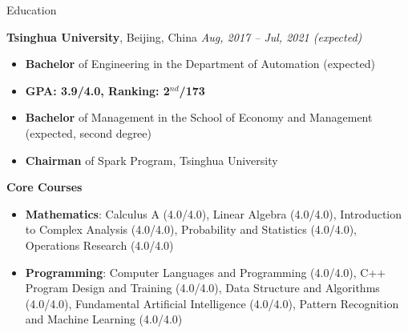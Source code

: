 \documentclass{resume} %
\begin{document}

\begin{rSection}{Education}

{\textbf{Tsinghua University}, Beijing, China} \hfill {\em Aug, 2017 -- Jul, 2021 (expected)}
\begin{itemize}
    \item \textbf{Bachelor} of Engineering in the Department of Automation (expected)
    \item \textbf{GPA: 3.9/4.0, Ranking: 2$^{nd}$/173}
    \item \textbf{Bachelor} of Management in the School of Economy and Management (expected, second degree)
    \item \textbf{Chairman} of Spark Program, Tsinghua University
\end{itemize}

\textbf{Core Courses}
\begin{spacing}{1.05}
\begin{itemize}
    \item \textbf{Mathematics}: Calculus A (4.0/4.0), 
    Linear Algebra (4.0/4.0), 
    Introduction to Complex Analysis (4.0/4.0), 
    Probability and Statistics (4.0/4.0), 
    Operations Research (4.0/4.0)
    \item \textbf{Programming}: Computer Languages and Programming (4.0/4.0), 
    C++ Program Design and Training (4.0/4.0), 
    Data Structure and Algorithms (4.0/4.0), 
    Fundamental Artificial Intelligence (4.0/4.0), 
    Pattern Recognition and Machine Learning (4.0/4.0)
\end{itemize}
\end{spacing}

\end{rSection}
\end{document}

